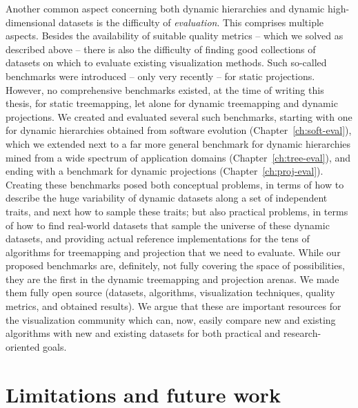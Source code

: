 Another common aspect concerning both dynamic hierarchies and dynamic high-dimensional datasets is the difficulty of \emph{evaluation}. This comprises multiple aspects. Besides the availability of suitable quality metrics -- which we solved as described above -- there is also the difficulty of finding good collections of datasets on which to evaluate existing visualization methods. Such so-called benchmarks were introduced -- only very recently -- for static projections. However, no comprehensive benchmarks existed, at the time of writing this thesis, for static treemapping, let alone for dynamic treemapping and dynamic projections. We created and evaluated several such benchmarks, starting with one for dynamic hierarchies obtained from software evolution (Chapter~\ref{ch:soft-eval}), which we extended next to a far more general benchmark for dynamic hierarchies mined from a wide spectrum of application domains (Chapter~\ref{ch:tree-eval}), and ending with a benchmark for dynamic projections (Chapter~\ref{ch:proj-eval}). 
Creating these benchmarks posed both conceptual problems, in terms of how to describe the huge variability of dynamic datasets along a set of independent traits, and next how to sample these traits; but also practical problems, in terms of how to find real-world datasets that sample the universe of these dynamic datasets, and providing actual reference implementations for the tens of algorithms for treemapping and projection that we need to evaluate. While our proposed benchmarks are, definitely, not fully covering the space of possibilities, they are the first in the dynamic treemapping and projection arenas. We made them fully open source (datasets, algorithms, visualization techniques, quality metrics, and obtained results). We argue that these are important resources for the visualization community which can, now, easily compare new and existing algorithms with new and existing datasets for both practical and research-oriented goals.


\section{Limitations and future work}
